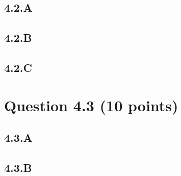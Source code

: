 \documentclass{article}
\begin{document}
\subsection*{4.2.A}

\subsection*{4.2.B}

\subsection*{4.2.C}


\section*{Question 4.3 (10 points)}

\subsection*{4.3.A}

\subsection*{4.3.B}
\end{document}
